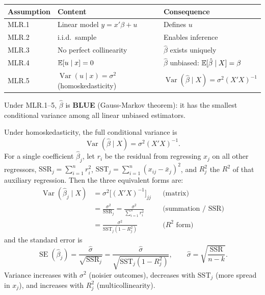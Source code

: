 \begin{remark}
	\begin{center}
		\begin{tabular}{lll}
			\hline
			\textbf{Assumption} & \textbf{Content} & \textbf{Consequence} \\
			\hline
			MLR.1 & Linear model $y=x'\beta+u$ & Defines $u$ \\
			MLR.2 & i.i.d.\ sample & Enables inference \\
			MLR.3 & No perfect collinearity & $\hat\beta$ exists uniquely \\
			MLR.4 & $\mathbb{E}[u\mid x]=0$ & $\hat\beta$ unbiased: $\mathbb{E}[\hat\beta\mid X]=\beta$ \\
			MLR.5 & $\operatorname{Var}(u\mid x)=\sigma^2$ (homoskedasticity) & $\operatorname{Var}(\hat\beta\mid X)=\sigma^2(X'X)^{-1}$ \\
			\hline
		\end{tabular}
	\end{center}
	Under MLR.1--5, $\hat\beta$ is \textbf{BLUE} (Gauss-Markov theorem): it has the smallest conditional variance among all linear unbiased estimators.
\end{remark}

\begin{remark}
	Under homoskedasticity, the full conditional variance is
	\[
		\operatorname{Var}(\hat\beta\mid X)=\sigma^2(X'X)^{-1}.
	\]
	For a single coefficient $\hat\beta_j$, let $r_i$ be the residual from regressing $x_j$ on all other regressors, $\text{SSR}_j=\sum_{i=1}^n r_i^2$, $\text{SST}_j=\sum_{i=1}^n(x_{ij}-\bar x_j)^2$, and $R_j^2$ the $R^2$ of that auxiliary regression. Then the three equivalent forms are:
	\begin{align*}
		\operatorname{Var}(\hat\beta_j\mid X)
		&=\sigma^2\bigl[(X'X)^{-1}\bigr]_{jj}
		&&\text{(matrix)}\\
		&=\frac{\sigma^2}{\text{SSR}_j}=\frac{\sigma^2}{\displaystyle\sum_{i=1}^n r_i^2}
		&&\text{(summation / SSR)}\\
		&=\frac{\sigma^2}{\text{SST}_j(1-R_j^2)}
		&&\text{($R^2$ form)}
	\end{align*}
	and the standard error is
	\[
		\operatorname{SE}(\hat\beta_j)
		=\frac{\hat\sigma}{\sqrt{\text{SSR}_j}}
		=\frac{\hat\sigma}{\sqrt{\text{SST}_j(1-R_j^2)}},
		\qquad\hat\sigma=\sqrt{\frac{\text{SSR}}{n-k}}.
	\]
	Variance increases with $\sigma^2$ (noisier outcomes), decreases with $\text{SST}_j$ (more spread in $x_j$), and increases with $R_j^2$ (multicollinearity).
\end{remark}

